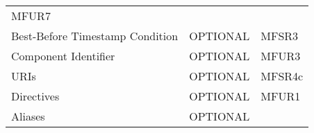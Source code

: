 \documentclass[0-thesis.tex]{subfiles}
\begin{document}
\begin{longtable}[]{@{}lll@{}}
\begin{minipage}[t]{0.23\columnwidth}
    MFUR7\strut
    \end{minipage}\tabularnewline
    \begin{minipage}[t]{0.32\columnwidth}\raggedright\strut
    Best-Before Timestamp Condition\strut
    \end{minipage} & \begin{minipage}[t]{0.36\columnwidth}\raggedright\strut
    OPTIONAL\strut
    \end{minipage} & \begin{minipage}[t]{0.23\columnwidth}\raggedright\strut
    MFSR3\strut
    \end{minipage}\tabularnewline
    \begin{minipage}[t]{0.32\columnwidth}\raggedright\strut
    Component Identifier\strut
    \end{minipage} & \begin{minipage}[t]{0.36\columnwidth}\raggedright\strut
    OPTIONAL\strut
    \end{minipage} & \begin{minipage}[t]{0.23\columnwidth}\raggedright\strut
    MFUR3\strut
    \end{minipage}\tabularnewline
    \begin{minipage}[t]{0.32\columnwidth}\raggedright\strut
    URIs\strut
    \end{minipage} & \begin{minipage}[t]{0.36\columnwidth}\raggedright\strut
    OPTIONAL\strut
    \end{minipage} & \begin{minipage}[t]{0.23\columnwidth}\raggedright\strut
    MFSR4c\strut
    \end{minipage}\tabularnewline
    \begin{minipage}[t]{0.32\columnwidth}\raggedright\strut
    Directives\strut
    \end{minipage} & \begin{minipage}[t]{0.36\columnwidth}\raggedright\strut
    OPTIONAL\strut
    \end{minipage} & \begin{minipage}[t]{0.23\columnwidth}\raggedright\strut
    MFUR1\strut
    \end{minipage}\tabularnewline
    \begin{minipage}[t]{0.32\columnwidth}\raggedright\strut
    Aliases\strut
    \end{minipage} & \begin{minipage}[t]{0.36\columnwidth}\raggedright\strut
    OPTIONAL\strut
    \end{minipage} & \begin{minipage}[t]{0.23\columnwidth}\raggedright\strut

\end{minipage}
\end{longtable}
\end{document}
